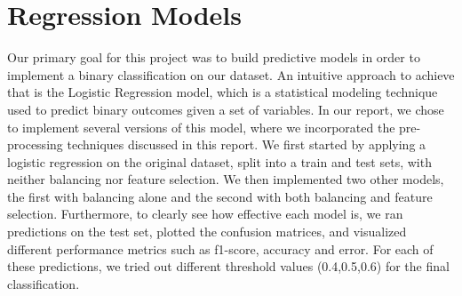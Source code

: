 \documentclass[
]{article}
\newenvironment{Shaded}{\begin{snugshade}}{\end{snugshade}}
\newcommand{\CommentTok}[1]{\textcolor[rgb]{0.56,0.35,0.01}{\textit{#1}}}
\newcommand{\ControlFlowTok}[1]{\textcolor[rgb]{0.13,0.29,0.53}{\textbf{#1}}}
\newcommand{\DecValTok}[1]{\textcolor[rgb]{0.00,0.00,0.81}{#1}}
\newcommand{\FunctionTok}[1]{\textcolor[rgb]{0.00,0.00,0.00}{#1}}
\newcommand{\NormalTok}[1]{#1}
\newcommand{\OtherTok}[1]{\textcolor[rgb]{0.56,0.35,0.01}{#1}}
\newcommand{\SpecialCharTok}[1]{\textcolor[rgb]{0.00,0.00,0.00}{#1}}
\begin{document}
\begin{Shaded}
\end{Shaded}

\hypertarget{regression-models}{%
\section{Regression Models}\label{regression-models}}

Our primary goal for this project was to build predictive models in
order to implement a binary classification on our dataset. An intuitive
approach to achieve that is the Logistic Regression model, which is a
statistical modeling technique used to predict binary outcomes given a
set of variables. In our report, we chose to implement several versions
of this model, where we incorporated the pre-processing techniques
discussed in this report. We first started by applying a logistic
regression on the original dataset, split into a train and test sets,
with neither balancing nor feature selection. We then implemented two
other models, the first with balancing alone and the second with both
balancing and feature selection. Furthermore, to clearly see how
effective each model is, we ran predictions on the test set, plotted the
confusion matrices, and visualized different performance metrics such as
f1-score, accuracy and error. For each of these predictions, we tried
out different threshold values (0.4,0.5,0.6) for the final
classification.
\end{document}
